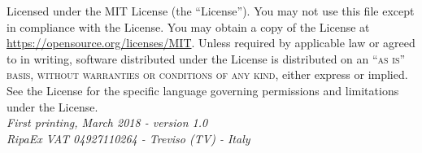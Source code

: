 \documentclass[11pt,fleqn,oneside]{book} %
\begin{document}
\noindent Licensed under the MIT License (the ``License''). You may not use this file except in compliance with the License. 
You may obtain a copy of the License at \url{https://opensource.org/licenses/MIT}. Unless required by applicable law or agreed to in writing, 
software distributed under the License is distributed on an \textsc{``as is'' basis, without warranties or conditions of any kind}, 
either express or implied. See the License for the specific language governing permissions and limitations under the License.\\ %

\noindent \textit{First printing, March 2018 - version 1.0}\\ %

\noindent \textit{RipaEx VAT 04927110264 - Treviso (TV) - Italy} %
\end{document}
